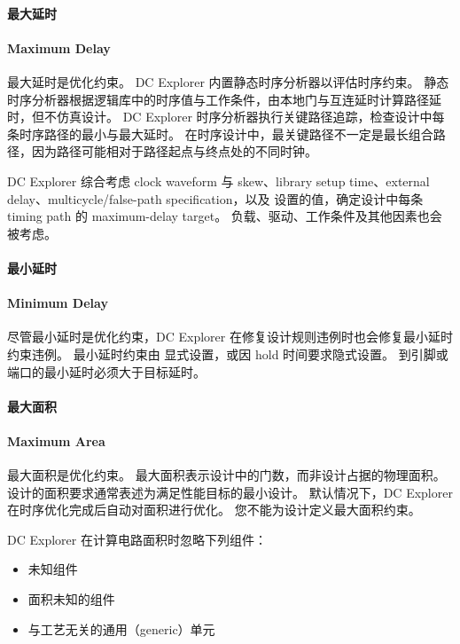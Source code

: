 \paragraph{最大延时}
\paragraph*{Maximum Delay}

最大延时是优化约束。
DC Explorer 内置静态时序分析器以评估时序约束。
静态时序分析器根据逻辑库中的时序值与工作条件，由本地门与互连延时计算路径延时，但不仿真设计。
DC Explorer 时序分析器执行关键路径追踪，检查设计中每条时序路径的最小与最大延时。
在时序设计中，最关键路径不一定是最长组合路径，因为路径可能相对于路径起点与终点处的不同时钟。

DC Explorer 综合考虑 clock waveform 与 skew、library setup time、external delay、multicycle/false-path specification，以及  设置的值，确定设计中每条 timing path 的 maximum-delay target。
负载、驱动、工作条件及其他因素也会被考虑。

\paragraph{最小延时}
\paragraph*{Minimum Delay}

尽管最小延时是优化约束，DC Explorer 在修复设计规则违例时也会修复最小延时约束违例。
最小延时约束由  显式设置，或因 hold 时间要求隐式设置。
到引脚或端口的最小延时必须大于目标延时。

\paragraph{最大面积}
\paragraph*{Maximum Area}

最大面积是优化约束。
最大面积表示设计中的门数，而非设计占据的物理面积。
设计的面积要求通常表述为满足性能目标的最小设计。
默认情况下，DC Explorer 在时序优化完成后自动对面积进行优化。
您不能为设计定义最大面积约束。

DC Explorer 在计算电路面积时忽略下列组件：
\begin{itemize}
  \item 未知组件
  \item 面积未知的组件
  \item 与工艺无关的通用（generic）单元
\end{itemize}

